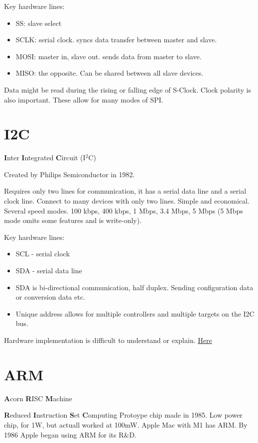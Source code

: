 \documentclass[11pt]{article}
\begin{document}
Key hardware lines:
\begin{itemize}
\item SS: slave select
\item SCLK: serial clock. syncs data transfer between master and slave.
\item MOSI: master in, slave out. sends data from master to slave.
\item MISO: the opposite. Can be shared between all slave devices.
\end{itemize}

Data might be read during the rising or falling edge of S-Clock. Clock
polarity is also important. These allow for many modes of SPI.

\section{I2C}
\label{sec:org6690b7d}
\textbf{I}nter \textbf{I}ntegrated \textbf{C}ircuit (I\(^2\)C)

Created by Philips Semiconductor in 1982.

Requires only two lines for communication, it has a serial data line
and a serial clock line. Connect to many devices with only two
lines. Simple and economical. Several speed modes.
100 kbps, 400 kbps, 1 Mbps, 3.4 Mbps, 5 Mbps (5 Mbps mode omits some
features and is write-only).

Key hardware lines:
\begin{itemize}
\item SCL - serial clock
\item SDA - serial data line
\item SDA is bi-directional communication, half duplex. Sending
configuration data or conversion data etc.
\item Unique address allows for multiple controllers and multiple targets
on the I2C bus.
\end{itemize}

Hardware implementation is difficult to understand or explain.
\href{https://training.ti.com/sites/default/files/docs/adcs-i2c-introduction-the-protocol-presentation.pdf}{Here}

\section{ARM}
\label{sec:orgfff0496}
\textbf{A}corn \textbf{R}ISC \textbf{M}achine

\textbf{R}educed \textbf{I}nstruction \textbf{S}et \textbf{C}omputing
Protoype chip made in 1985. Low power chip, for 1W, but actuall worked
at 100mW. Apple Mac with M1 has ARM. By 1986 Apple began using ARM for
its R\&D.
\end{document}
